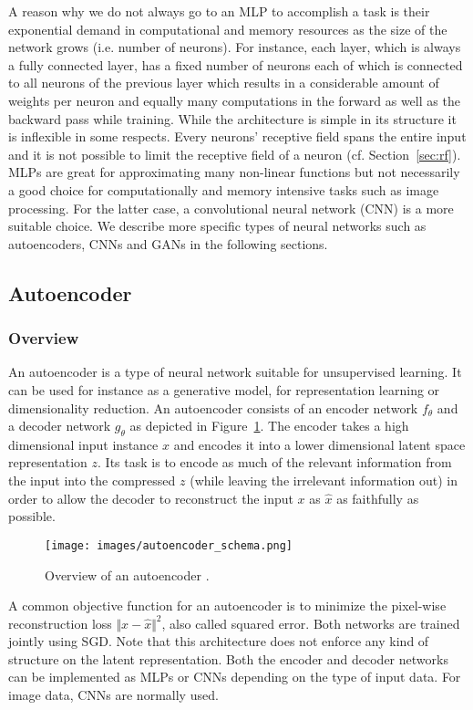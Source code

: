 \documentclass[12pt,a4paper]{article}
\begin{document}
A reason why we do not always go to an MLP to accomplish a task is their exponential demand in computational and memory resources as the size of the network grows (i.e. number of neurons). For instance, each layer, which is always a fully connected layer, has a fixed number of neurons each of which is connected to all neurons of the previous layer which results in a considerable amount of weights per neuron and equally many computations in the forward as well as the backward pass while training. While the architecture is simple in its structure it is inflexible in some respects. Every neurons' receptive field spans the entire input and it is not possible to limit the receptive field of a neuron (cf. Section~\ref{sec:rf}). MLPs are great for approximating many non-linear functions but not necessarily a good choice for computationally and memory intensive tasks such as image processing. For the latter case, a convolutional neural network (CNN) is a more suitable choice. We describe more specific types of neural networks such as autoencoders, CNNs and GANs in the following sections.

\subsection{Autoencoder}
\subsubsection{Overview}
An autoencoder is a type of neural network suitable for unsupervised learning. It can be used for instance as a generative model, for representation learning or dimensionality reduction. An autoencoder consists of an encoder network $f_{\theta}$ and a decoder network  $g_{\theta}$ as depicted in Figure~\ref{fig:autoencoder}. The encoder takes a high dimensional input instance $x$ and encodes it into a lower dimensional latent space representation $z$. Its task is to encode as much of the relevant information from the input into the compressed $z$ (while leaving the irrelevant information out) in order to allow the decoder to reconstruct the input $x$ as $\hat{x}$ as faithfully as possible.
\begin{figure}[ht]
\centering
\texttt{[image: images/autoencoder\_schema.png]}
\caption{Overview of an autoencoder \cite{chollet_autoencoders}.}
\label{fig:autoencoder}
\end{figure}
A common objective function for an autoencoder is to minimize the pixel-wise reconstruction loss $\Vert x - \hat{x} \Vert^2$, also called squared error. Both networks are trained jointly using SGD. Note that this architecture does not enforce any kind of structure on the latent representation. Both the encoder and decoder networks can be implemented as MLPs or CNNs depending on the type of input data. For image data, CNNs are normally used.
\end{document}
